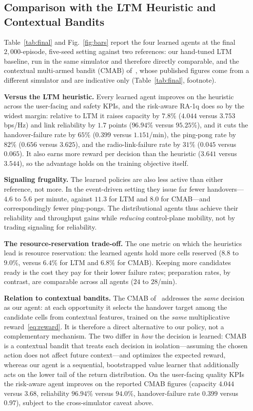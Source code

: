 \documentclass[conference]{IEEEtran}
\begin{document}
\subsection{Comparison with the LTM Heuristic and Contextual Bandits}
\label{sec:results-main}
Table~\ref{tab:final} and Fig.~\ref{fig:bars} report the four learned agents at the final
$2{,}000$-episode, five-seed setting against two references: our hand-tuned LTM
baseline, run in the same simulator and therefore directly comparable, and the
contextual multi-armed bandit (CMAB) of~\cite{cmab_ho}, whose published figures
come from a different simulator and are indicative only (Table~\ref{tab:final},
footnote).

\textbf{Versus the LTM heuristic.} Every learned agent improves on the heuristic
across the user-facing and safety KPIs, and the risk-aware RA-1q does so by the
widest margin: relative to LTM it raises capacity by $7.8\%$ ($4.044$ versus
$3.753$\,bps/Hz) and link reliability by $1.7$ points ($96.94\%$ versus
$95.25\%$), and it cuts the handover-failure rate by $65\%$ ($0.399$ versus
$1.151$/min), the ping-pong rate by $82\%$ ($0.656$ versus $3.625$), and the
radio-link-failure rate by $31\%$ ($0.045$ versus $0.065$).
It also earns more reward per decision than the heuristic ($3.641$ versus
$3.544$), so the advantage holds on the training objective itself.

\textbf{Signaling frugality.} The learned policies are also less active than either
reference, not more. In the event-driven setting they issue far fewer
handovers---$4.6$ to $5.6$ per minute, against $11.3$ for LTM and $8.0$ for
CMAB---and correspondingly fewer ping-pongs. The distributional agents thus achieve
their reliability and throughput gains while \emph{reducing} control-plane
mobility, not by trading signaling for reliability.

\textbf{The resource-reservation trade-off.} The one metric on which the
heuristics lead is resource reservation: the learned agents hold more cells
reserved ($8.8$ to $9.0\%$, versus $6.4\%$ for LTM and $6.8\%$ for CMAB). Keeping
more candidates ready is the cost they pay for their lower failure rates;
preparation rates, by contrast, are comparable across all agents ($24$ to
$28$/min).

\textbf{Relation to contextual bandits.} The CMAB of~\cite{cmab_ho} addresses
the \emph{same} decision as our agent: at each opportunity it selects the handover
target among the candidate cells from contextual features, trained on the
\emph{same} multiplicative reward~\eqref{eq:reward}. It is therefore a direct
alternative to our policy, not a complementary mechanism. The two differ in
\emph{how} the decision is learned: CMAB is a contextual bandit that treats each
decision in isolation---assuming the chosen action does not affect future
context---and optimizes the expected reward, whereas our agent is a sequential,
bootstrapped value learner that additionally acts on the lower tail of the return
distribution. On the user-facing quality KPIs the risk-aware agent improves on the
reported CMAB figures (capacity $4.044$ versus $3.68$, reliability $96.94\%$ versus
$94.0\%$, handover-failure rate $0.399$ versus $0.97$), subject to the
cross-simulator caveat above.
\end{document}
